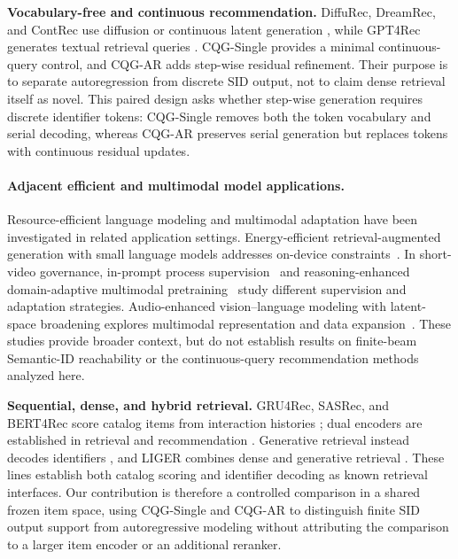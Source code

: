 \documentclass[letterpaper]{article}
\begin{document}
\textbf{Vocabulary-free and continuous recommendation.}
DiffuRec, DreamRec, and ContRec use diffusion or continuous latent generation
\citep{10.1145/3631116,yang2023dreamrec,qu2026contrec}, while GPT4Rec generates
textual retrieval queries \citep{li2023gpt4recgenerativeframeworkpersonalized}. CQG-Single provides a minimal
continuous-query control, and CQG-AR adds step-wise residual refinement. Their
purpose is to separate autoregression from discrete SID output, not to claim
dense retrieval itself as novel. This paired design asks whether step-wise
generation requires discrete identifier tokens: CQG-Single removes both the
token vocabulary and serial decoding, whereas CQG-AR preserves serial
generation but replaces tokens with continuous residual updates.

\paragraph{Adjacent efficient and multimodal model applications.}
Resource-efficient language modeling and multimodal adaptation have been investigated in related application settings. Energy-efficient retrieval-augmented generation with small language models addresses on-device constraints~\citep{cheng2026toward}. In short-video governance, in-prompt process supervision~\citep{liu-etal-2026-ips} and reasoning-enhanced domain-adaptive multimodal pretraining~\citep{wang-etal-2025-reasoning-enhanced} study different supervision and adaptation strategies. Audio-enhanced vision--language modeling with latent-space broadening explores multimodal representation and data expansion~\citep{10.1145/3711896.3737195}. These studies provide broader context, but do not establish results on finite-beam Semantic-ID reachability or the continuous-query recommendation methods analyzed here.

\textbf{Sequential, dense, and hybrid retrieval.}
GRU4Rec, SASRec, and BERT4Rec score catalog items from interaction histories
\citep{hidasi2016gru4rec,kang2018sasrec,sun2019bert4rec}; dual encoders are
established in retrieval and recommendation
\citep{huang2013dssm,covington2016youtube}. Generative retrieval instead
decodes identifiers \citep{tay2022dsi,wang2022nci}, and LIGER combines dense
and generative retrieval \citep{yang2024liger}. These lines establish both
catalog scoring and identifier decoding as known retrieval interfaces.
Our contribution is therefore a controlled comparison in a shared frozen item
space, using CQG-Single and CQG-AR to distinguish finite SID output support
from autoregressive modeling without attributing the comparison to a larger
item encoder or an additional reranker.
\end{document}
